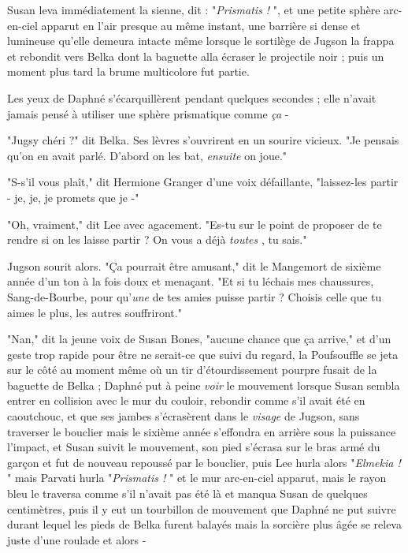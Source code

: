 Susan leva immédiatement la sienne, dit : "\emph{Prismatis !} ", et une petite sphère arc-en-ciel apparut en l'air presque au même instant, une barrière si dense et lumineuse qu'elle demeura intacte même lorsque le sortilège de Jugson la frappa et rebondit vers Belka dont la baguette alla écraser le projectile noir ; puis un moment plus tard la brume multicolore fut partie.

Les yeux de Daphné s'écarquillèrent pendant quelques secondes ; elle n'avait jamais pensé à utiliser une sphère prismatique comme \emph{ça}  -

"Jugsy chéri ?" dit Belka. Ses lèvres s'ouvrirent en un sourire vicieux. "Je pensais qu'on en avait parlé. D'abord on les bat, \emph{ensuite}  on joue."

"S-s'il vous plaît," dit Hermione Granger d'une voix défaillante, "laissez-les partir - je, je, je promets que je -"

"Oh, vraiment," dit Lee avec agacement. "Es-tu sur le point de proposer de te rendre si on les laisse partir ? On vous a déjà \emph{toutes} , tu sais."

Jugson sourit alors. "Ça pourrait être amusant," dit le Mangemort de sixième année d'un ton à la fois doux et menaçant. "Et si tu léchais mes chaussures, Sang-de-Bourbe, pour qu'\emph{une}  de tes amies puisse partir ? Choisis celle que tu aimes le plus, les autres souffriront."

"Nan," dit la jeune voix de Susan Bones, "aucune chance que ça arrive," et d'un geste trop rapide pour être ne serait-ce que suivi du regard, la Poufsouffle se jeta sur le côté au moment même où un tir d'étourdissement pourpre fusait de la baguette de Belka ; Daphné put à peine \emph{voir}  le mouvement lorsque Susan sembla entrer en collision avec le mur du couloir, rebondir comme s'il avait été en caoutchouc, et que ses jambes s'écrasèrent dans le \emph{visage}  de Jugson, sans traverser le bouclier mais le sixième année s'effondra en arrière sous la puissance l'impact, et Susan suivit le mouvement, son pied s'écrasa sur le bras armé du garçon et fut de nouveau repoussé par le bouclier, puis Lee hurla alors "\emph{Elmekia !} " mais Parvati hurla "\emph{Prismatis !} " et le mur arc-en-ciel apparut, mais le rayon bleu le traversa comme s'il n'avait pas été là et manqua Susan de quelques centimètres, puis il y eut un tourbillon de mouvement que Daphné ne put suivre durant lequel les pieds de Belka furent balayés mais la sorcière plus âgée se releva juste d'une roulade et alors -

